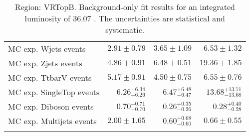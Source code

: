 \begin{table}
\begin{center}
{\begin{tabular*}{\textwidth}{@{\extracolsep{\fill}}lrrr}
        MC exp. Wjets events         & $2.91 \pm 0.79$          & $3.65 \pm 1.09$          & $6.53 \pm 1.32$              \\
        MC exp. Zjets events         & $4.86 \pm 0.91$          & $6.48 \pm 0.51$          & $19.36 \pm 1.85$              \\
        MC exp. TtbarV events         & $5.17 \pm 0.91$          & $4.50 \pm 0.75$          & $6.55 \pm 0.76$              \\
        MC exp. SingleTop events         & $6.26_{-6.26}^{+6.34}$          & $6.47_{-6.47}^{+6.48}$          & $13.68_{-13.68}^{+13.71}$              \\
        MC exp. Diboson events         & $0.70_{-0.70}^{+0.71}$          & $0.26_{-0.26}^{+0.35}$          & $0.28_{-0.28}^{+0.40}$              \\
        MC exp. Multijets events         & $2.00 \pm 1.65$          & $0.60_{-0.60}^{+0.68}$          & $0.66 \pm 0.55$              \\
\noalign{\smallskip}\hline\noalign{\smallskip}
\end{tabular*}
}
\end{center}
\caption{Region: VRTopB. Background-only fit results for an integrated luminosity of 36.07 \ifb. The uncertainties are statistical and systematic.
}
\label{table.bkgonly.VRTopB}
\end{table}
%